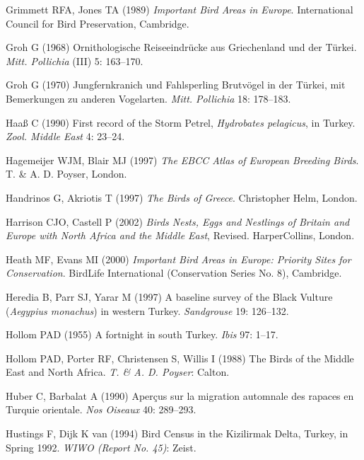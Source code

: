 \documentclass[
  letterpaper,
  DIV=11,
  numbers=noendperiod]{scrreprt}
\newlength{\cslhangindent}
\newenvironment{CSLReferences}[2] %
 {\begin{list}{}{%
  \setlength{\itemindent}{0pt}
  \setlength{\leftmargin}{0pt}
  \setlength{\parsep}{0pt}
  \ifodd #1
   \setlength{\leftmargin}{\cslhangindent}
   \setlength{\itemindent}{-1\cslhangindent}
  \fi
  \setlength{\itemsep}{#2\baselineskip}}}
 {\end{list}}
\begin{document}
\begin{CSLReferences}{0}{1}
Grimmett RFA, Jones TA (1989) \emph{{Important Bird Areas in Europe}}.
International Council for Bird Preservation, Cambridge.

Groh G (1968) {Ornithologische Reiseeindrücke aus Griechenland und der
Türkei}. \emph{Mitt. Pollichia} (III) 5: 163--170.

Groh G (1970) {Jungfernkranich und Fahlsperling Brutvögel in der Türkei,
mit Bemerkungen zu anderen Vogelarten}. \emph{Mitt. Pollichia} 18:
178--183.

Haaß C (1990) {First record of the Storm Petrel, \emph{Hydrobates
pelagicus}, in Turkey}. \emph{Zool. Middle East} 4: 23--24.

Hagemeijer WJM, Blair MJ (1997) \emph{{The EBCC Atlas of European
Breeding Birds}}. T. \& A. D. Poyser, London.

Handrinos G, Akriotis T (1997) \emph{{The Birds of Greece}}. Christopher
Helm, London.

Harrison CJO, Castell P (2002) \emph{{Birds Nests, Eggs and Nestlings of
Britain and Europe with North Africa and the Middle East}}, Revised.
HarperCollins, London.

Heath MF, Evans MI (2000) \emph{{Important Bird Areas in Europe:
Priority Sites for Conservation}}. BirdLife International (Conservation
Series No. 8), Cambridge.

Heredia B, Parr SJ, Yarar M (1997) {A baseline survey of the Black
Vulture (\emph{Aegypius monachus}) in western Turkey}. \emph{Sandgrouse}
19: 126--132.

Hollom PAD (1955) {A fortnight in south Turkey}. \emph{Ibis} 97: 1--17.

Hollom PAD, Porter RF, Christensen S, Willis I (1988) {The Birds of the
Middle East and North Africa}. \emph{T. \& A. D. Poyser}: Calton.

Huber C, Barbalat A (1990) {Aperçus sur la migration automnale des
rapaces en Turquie orientale}. \emph{Nos Oiseaux} 40: 289--293.

Hustings F, Dijk K van (1994) {Bird Census in the Kizilirmak Delta,
Turkey, in Spring 1992}. \emph{WIWO (Report No. 45)}: Zeist.


\end{CSLReferences}
\end{document}
